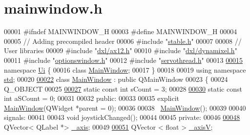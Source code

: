 \hypertarget{mainwindow_8h_source}{}\section{mainwindow.\+h}

\begin{DoxyCode}
00001 \textcolor{preprocessor}{#ifndef MAINWINDOW\_H}
00003 \textcolor{preprocessor}{#define MAINWINDOW\_H}
00004 
00005 \textcolor{comment}{// Adding precompiled header}
00006 \textcolor{preprocessor}{#include "\hyperlink{stable_8h}{stable.h}"}
00007 
00008 \textcolor{comment}{// User libraries}
00009 \textcolor{preprocessor}{#include "\hyperlink{ax12_8h}{dxl/ax12.h}"}
00010 \textcolor{preprocessor}{#include "\hyperlink{dynamixel_8h}{dxl/dynamixel.h}"}
00011 \textcolor{preprocessor}{#include "\hyperlink{optionswindow_8h}{optionswindow.h}"}
00012 \textcolor{preprocessor}{#include "\hyperlink{servothread_8h}{servothread.h}"}
00013 
\hypertarget{mainwindow_8h_source_l00015}{}\hyperlink{namespace_ui}{00015} \textcolor{keyword}{namespace }\hyperlink{namespace_ui}{Ui} \{
00016 \textcolor{keyword}{class }\hyperlink{class_main_window}{MainWindow};
00017 \}
00018 
00019 \textcolor{keyword}{using namespace }\hyperlink{namespacestd}{std};
00020 
\hypertarget{mainwindow_8h_source_l00022}{}\hyperlink{class_main_window}{00022} \textcolor{keyword}{class }\hyperlink{class_main_window}{MainWindow} : \textcolor{keyword}{public} QMainWindow
00023 \{
00024     Q\_OBJECT
00025     
\hypertarget{mainwindow_8h_source_l00027}{}\hyperlink{class_main_window_a646727b1c45c72638325adfd460649c0}{00027}     \textcolor{keyword}{static} \textcolor{keyword}{const} \textcolor{keywordtype}{int} sCount = 3;
00028     
\hypertarget{mainwindow_8h_source_l00030}{}\hyperlink{class_main_window_a42c44af9c0eebc33f4e81f02e15b0461}{00030}     \textcolor{keyword}{static} \textcolor{keyword}{const} \textcolor{keywordtype}{int} aSCount = 0;
00031     
00032 \textcolor{keyword}{public}:
00033     
00035     \textcolor{keyword}{explicit} \hyperlink{class_main_window}{MainWindow}(QWidget *parent = 0);
00036     
00038     ~\hyperlink{class_main_window}{MainWindow}();
00039     
00040 signals:
00041     
00043     \textcolor{keywordtype}{void} joystickChanged();
00044 
00045 \textcolor{keyword}{private}:  
00046     
\hypertarget{mainwindow_8h_source_l00048}{}\hyperlink{class_main_window_a30c99d7a544f74b0650758e5cc7ead5a}{00048}     QVector< QLabel *> \hyperlink{class_main_window_a30c99d7a544f74b0650758e5cc7ead5a}{\_axis};
00049     
\hypertarget{mainwindow_8h_source_l00051}{}\hyperlink{class_main_window_a20f66f574ed4c96d8dfc0013e1095f15}{00051}     QVector < float > \hyperlink{class_main_window_a20f66f574ed4c96d8dfc0013e1095f15}{\_axisV};

\end{DoxyCode}
